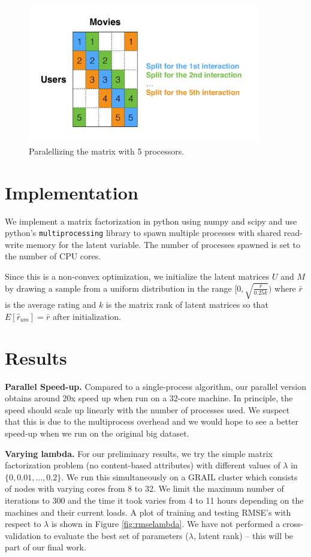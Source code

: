\documentclass{article} %
\begin{document}
\begin{figure}[h]
\centering
\includegraphics[width=4in]{figures/split.pdf}
\caption{\label{fig:split} Paralellizing the matrix with 5 processors.}
\end{figure}

\section{Implementation}

We implement a matrix factorization in python using numpy and scipy and use python's \texttt{multiprocessing} library to spawn multiple processes with shared read-write memory for the latent variable. The number of processes spawned is set to the number of CPU cores.

Since this is a non-convex optimization, we initialize the latent matrices $U$ and $M$ by drawing a sample from a uniform distribution in the range $[0,\sqrt{\frac{\bar{r}}{0.25k}})$ where $\bar{r}$ is the average rating and $k$ is the matrix rank of latent matrices so that $E[\hat{r}_{um}] = \bar{r}$ after initialization.


\section{Results}

\textbf{Parallel Speed-up.}
Compared to a single-process algorithm, our parallel version obtains around 20x speed up when run on a 32-core machine. In principle, the speed should scale up linearly with the number of processes used. We suspect that this is due to the multiprocess overhead and we would hope to see a better speed-up when we run on the original big dataset.

\textbf{Varying lambda.} For our preliminary results, we try the simple matrix factorization problem (no content-based attributes) with different values of $\lambda$ in $\{0, 0.01, \ldots, 0.2\}$. We run this simultaneously on a GRAIL cluster which consists of nodes with varying cores from 8 to 32. We limit the maximum number of iterations to 300 and the time it took varies from 4 to 11 hours depending on the machines and their current loads. A plot of training and testing RMSE's with respect to $\lambda$ is shown in Figure \ref{fig:rmselambda}. We have not performed a cross-validation to evaluate the best set of parameters ($\lambda$, latent rank) -- this will be part of our final work.
\end{document}
